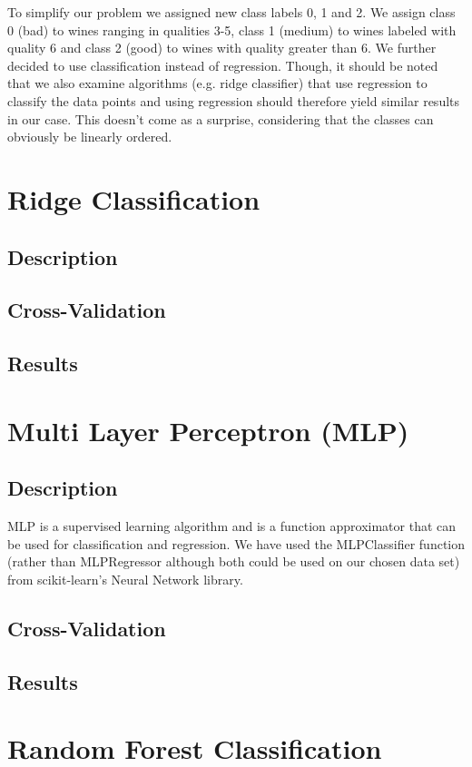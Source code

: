 \documentclass[twocolumn]{scrartcl}
\begin{document}
To simplify our problem we assigned new class labels 0, 1 and 2. We assign class 0 (bad) to wines ranging in qualities 3-5,
class 1 (medium) to wines labeled with quality 6 and class 2 (good) to wines with quality greater than 6.
We further decided to use classification instead of regression.
Though, it should be noted that we also examine algorithms (e.g. ridge classifier) that use regression to classify the data points
and using regression should therefore yield similar results in our case.
This doesn't come as a surprise, considering that the classes can obviously be linearly ordered.

\section{Ridge Classification}
\subsection{Description}
\subsection{Cross-Validation}
\subsection{Results}

\section{Multi Layer Perceptron (MLP)}
\subsection{Description}
MLP is a supervised learning algorithm and is a function approximator that can be used for classification and regression. We have used the MLPClassifier function (rather than MLPRegressor although both could be used on our  chosen data set) from scikit-learn's Neural Network library.

\subsection{Cross-Validation}
\subsection{Results}

\section{Random Forest Classification}
\end{document}
